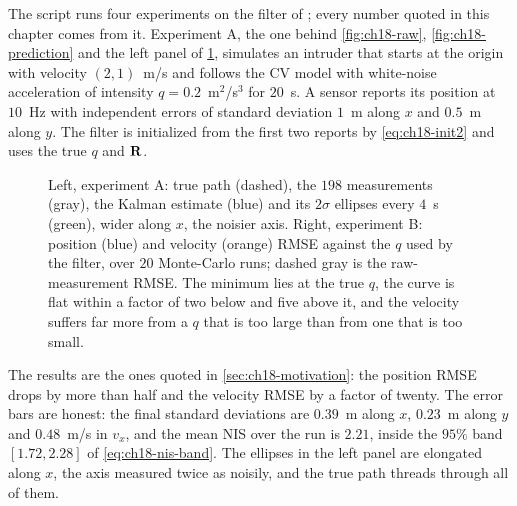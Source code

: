 The script  runs four experiments
on the filter of ; every number quoted in this
chapter comes from it. Experiment A, the one behind \cref{fig:ch18-raw},
\cref{fig:ch18-prediction} and the left panel of \cref{fig:ch18-experiment},
simulates an intruder that starts at the origin with velocity $(2,1)$~m/s and
follows the CV model with white-noise acceleration of intensity
$q=0.2$~m$^2$/s$^3$ for $20$~s. A sensor reports its position at $10$~Hz
with independent errors of standard deviation $1$~m along $x$ and $0.5$~m
along $y$. The filter is initialized from the first two reports by
\cref{eq:ch18-init2} and uses the true $q$ and $\mathbf{R}$.

\begin{figure}[tb]
  \centering
  \caption{Left, experiment A: true path (dashed), the $198$ measurements
  (gray), the Kalman estimate (blue) and its $2\sigma$ ellipses every $4$~s
  (green), wider along $x$, the noisier axis. Right, experiment B: position
  (blue) and velocity (orange) RMSE against the $q$ used by the filter, over
  $20$ Monte-Carlo runs; dashed gray is the raw-measurement RMSE. The minimum
  lies at the true $q$, the curve is flat within a factor of two below and
  five above it, and the velocity suffers far more from a $q$ that is too
  large than from one that is too small.}
  \label{fig:ch18-experiment}
\end{figure}

The results are the ones quoted in \cref{sec:ch18-motivation}: the position
RMSE drops by more than half and the velocity RMSE by a factor of twenty. The
error bars are honest: the final standard deviations are $0.39$~m along $x$, $0.23$~m along
$y$ and $0.48$~m/s in $v_x$, and the mean NIS over the run is $2.21$, inside
the $95\%$ band $[1.72,2.28]$ of \cref{eq:ch18-nis-band}. The ellipses in
the left panel are elongated along $x$, the axis measured twice as noisily,
and the true path threads through all of them.

